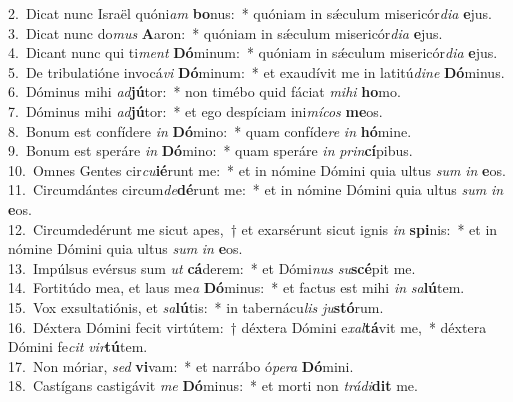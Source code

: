 {2.~}Dicat nunc Israël quóni\textit{am} \textbf{bo}nus:~* quóniam in sǽculum misericór\textit{di}\textit{a} \textbf{e}jus.\\
{3.~}Dicat nunc do\textit{mus} \textbf{A}aron:~* quóniam in sǽculum misericór\textit{di}\textit{a} \textbf{e}jus.\\
{4.~}Dicant nunc qui ti\textit{ment} \textbf{Dó}minum:~* quóniam in sǽculum misericór\textit{di}\textit{a} \textbf{e}jus.\\
{5.~}De tribulatióne invocá\textit{vi} \textbf{Dó}minum:~* et exaudívit me in latitú\textit{di}\textit{ne} \textbf{Dó}minus.\\
{6.~}Dóminus mihi \textit{ad}\textbf{jú}tor:~* non timébo quid fáciat \textit{mi}\textit{hi} \textbf{ho}mo.\\
{7.~}Dóminus mihi \textit{ad}\textbf{jú}tor:~* et ego despíciam ini\textit{mí}\textit{cos} \textbf{me}os.\\
{8.~}Bonum est confídere \textit{in} \textbf{Dó}mino:~* quam confíde\textit{re} \textit{in} \textbf{hó}mine.\\
{9.~}Bonum est speráre \textit{in} \textbf{Dó}mino:~* quam speráre \textit{in} \textit{prin}\textbf{cí}pibus.\\
{10.~}Omnes Gentes cir\textit{cu}\textbf{ié}runt me:~* et in nómine Dómini quia ultus \textit{sum} \textit{in} \textbf{e}os.\\
{11.~}Circumdántes circum\textit{de}\textbf{dé}runt me:~* et in nómine Dómini quia ultus \textit{sum} \textit{in} \textbf{e}os.\\
{12.~}Circumdedérunt me sicut apes,~† et exarsérunt sicut ignis \textit{in} \textbf{spi}nis:~* et in nómine Dómini quia ultus \textit{sum} \textit{in} \textbf{e}os.\\
{13.~}Impúlsus evérsus sum \textit{ut} \textbf{cá}derem:~* et Dómi\textit{nus} \textit{su}\textbf{scé}pit me.\\
{14.~}Fortitúdo mea, et laus me\textit{a} \textbf{Dó}minus:~* et factus est mihi \textit{in} \textit{sa}\textbf{lú}tem.\\
{15.~}Vox exsultatiónis, et \textit{sa}\textbf{lú}tis:~* in tabernácu\textit{lis} \textit{ju}\textbf{stó}rum.\\
{16.~}Déxtera Dómini fecit virtútem:~† déxtera Dómini e\textit{xal}\textbf{tá}vit me,~* déxtera Dómini fe\textit{cit} \textit{vir}\textbf{tú}tem.\\
{17.~}Non móriar, \textit{sed} \textbf{vi}vam:~* et narrábo ó\textit{pe}\textit{ra} \textbf{Dó}mini.\\
{18.~}Castígans castigávit \textit{me} \textbf{Dó}minus:~* et morti non \textit{trá}\textit{di}\textbf{dit} me.\\
